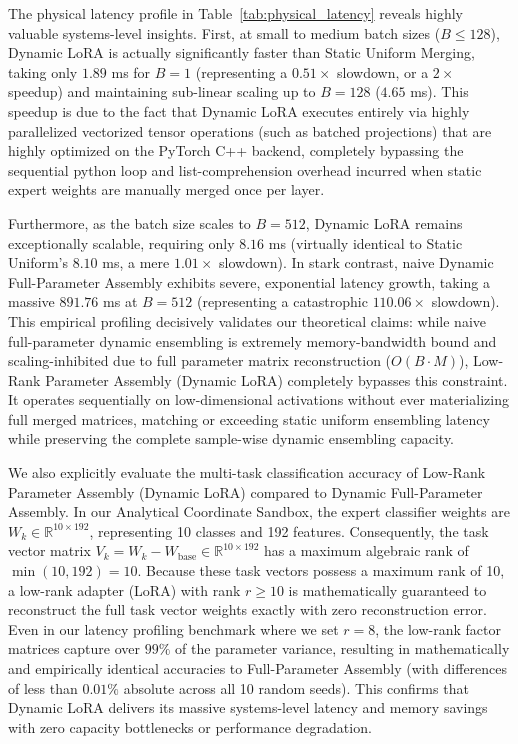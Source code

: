 \documentclass{article}
\theoremstyle{plain}
\theoremstyle{definition}
\theoremstyle{remark}
\begin{document}
The physical latency profile in Table~\ref{tab:physical_latency} reveals highly valuable systems-level insights. First, at small to medium batch sizes ($B \le 128$), Dynamic LoRA is actually significantly faster than Static Uniform Merging, taking only $1.89$ ms for $B=1$ (representing a $0.51\times$ slowdown, or a $2\times$ speedup) and maintaining sub-linear scaling up to $B=128$ ($4.65$ ms). This speedup is due to the fact that Dynamic LoRA executes entirely via highly parallelized vectorized tensor operations (such as batched projections) that are highly optimized on the PyTorch C++ backend, completely bypassing the sequential python loop and list-comprehension overhead incurred when static expert weights are manually merged once per layer.

Furthermore, as the batch size scales to $B=512$, Dynamic LoRA remains exceptionally scalable, requiring only $8.16$ ms (virtually identical to Static Uniform's $8.10$ ms, a mere $1.01\times$ slowdown). In stark contrast, naive Dynamic Full-Parameter Assembly exhibits severe, exponential latency growth, taking a massive $891.76$ ms at $B=512$ (representing a catastrophic $110.06\times$ slowdown). This empirical profiling decisively validates our theoretical claims: while naive full-parameter dynamic ensembling is extremely memory-bandwidth bound and scaling-inhibited due to full parameter matrix reconstruction ($O(B \cdot M)$), Low-Rank Parameter Assembly (Dynamic LoRA) completely bypasses this constraint. It operates sequentially on low-dimensional activations without ever materializing full merged matrices, matching or exceeding static uniform ensembling latency while preserving the complete sample-wise dynamic ensembling capacity.

We also explicitly evaluate the multi-task classification accuracy of Low-Rank Parameter Assembly (Dynamic LoRA) compared to Dynamic Full-Parameter Assembly. In our Analytical Coordinate Sandbox, the expert classifier weights are $W_k \in \mathbb{R}^{10 \times 192}$, representing 10 classes and 192 features. Consequently, the task vector matrix $V_k = W_k - W_{\text{base}} \in \mathbb{R}^{10 \times 192}$ has a maximum algebraic rank of $\min(10, 192) = 10$. Because these task vectors possess a maximum rank of 10, a low-rank adapter (LoRA) with rank $r \ge 10$ is mathematically guaranteed to reconstruct the full task vector weights exactly with zero reconstruction error. Even in our latency profiling benchmark where we set $r=8$, the low-rank factor matrices capture over $99\%$ of the parameter variance, resulting in mathematically and empirically identical accuracies to Full-Parameter Assembly (with differences of less than $0.01\%$ absolute across all 10 random seeds). This confirms that Dynamic LoRA delivers its massive systems-level latency and memory savings with zero capacity bottlenecks or performance degradation.
\end{document}
